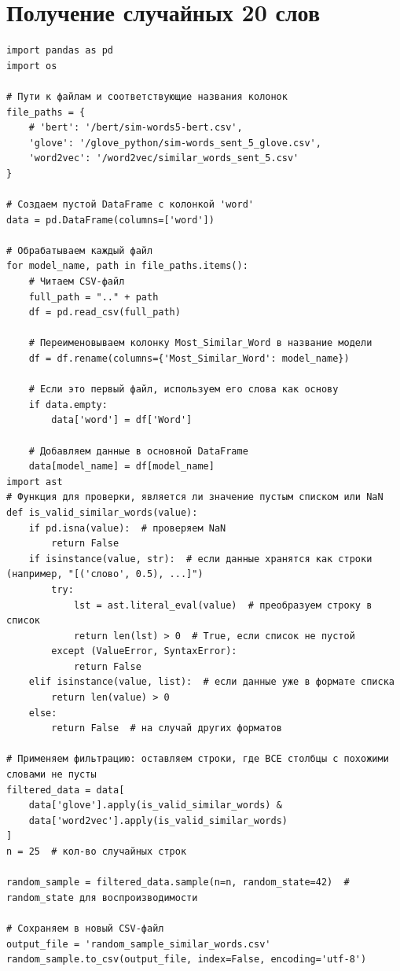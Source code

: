 \documentclass[coursework]{SCWorks}
\begin{document}
\section{Получение случайных 20 слов}
\label{apx:cherrypick}
\begin{verbatim}
import pandas as pd
import os

# Пути к файлам и соответствующие названия колонок
file_paths = {
    # 'bert': '/bert/sim-words5-bert.csv',
    'glove': '/glove_python/sim-words_sent_5_glove.csv',
    'word2vec': '/word2vec/similar_words_sent_5.csv'
}

# Создаем пустой DataFrame с колонкой 'word'
data = pd.DataFrame(columns=['word'])

# Обрабатываем каждый файл
for model_name, path in file_paths.items():
    # Читаем CSV-файл
    full_path = ".." + path
    df = pd.read_csv(full_path)
    
    # Переименовываем колонку Most_Similar_Word в название модели
    df = df.rename(columns={'Most_Similar_Word': model_name})
    
    # Если это первый файл, используем его слова как основу
    if data.empty:
        data['word'] = df['Word']
    
    # Добавляем данные в основной DataFrame
    data[model_name] = df[model_name]
import ast
# Функция для проверки, является ли значение пустым списком или NaN
def is_valid_similar_words(value):
    if pd.isna(value):  # проверяем NaN
        return False
    if isinstance(value, str):  # если данные хранятся как строки (например, "[('слово', 0.5), ...]")
        try:
            lst = ast.literal_eval(value)  # преобразуем строку в список
            return len(lst) > 0  # True, если список не пустой
        except (ValueError, SyntaxError):
            return False
    elif isinstance(value, list):  # если данные уже в формате списка
        return len(value) > 0
    else:
        return False  # на случай других форматов

# Применяем фильтрацию: оставляем строки, где ВСЕ столбцы с похожими словами не пусты
filtered_data = data[
    data['glove'].apply(is_valid_similar_words) &
    data['word2vec'].apply(is_valid_similar_words)
]
n = 25  # кол-во случайных строк

random_sample = filtered_data.sample(n=n, random_state=42)  # random_state для воспроизводимости

# Сохраняем в новый CSV-файл
output_file = 'random_sample_similar_words.csv'
random_sample.to_csv(output_file, index=False, encoding='utf-8')
\end{verbatim}
\end{document}
